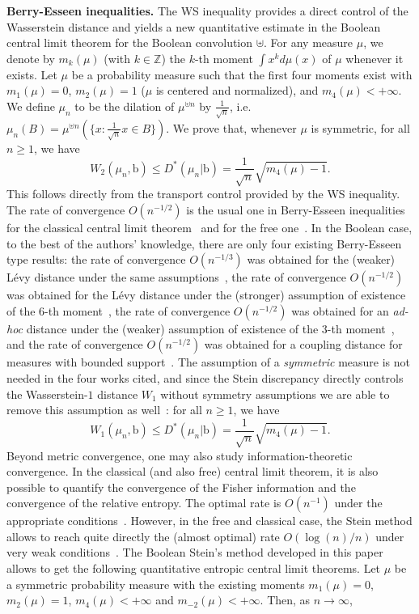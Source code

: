 \documentclass[10pt, reqno]{amsart}
\numberwithin{equation}{section}
\theoremstyle{definition}
\theoremstyle{plain}
\theoremstyle{remark}
\newcommand{\1}{\mathbbm{1}}
\begin{document}
\noindent \textbf{Berry-Esseen inequalities.} The WS inequality provides a direct control of the Wasserstein distance and yields a new quantitative estimate in the Boolean central limit theorem for the Boolean convolution $\uplus$. For any measure $\mu$, we denote by $m_k(\mu)$ (with $k\in \mathbb{Z}$) the $k$-th moment $\int x^k d\mu(x)$ of $\mu$ whenever it exists. Let $\mu$ be a probability measure such that the first four moments exist with $m_1(\mu) = 0$, $m_2(\mu) = 1$ ($\mu$ is centered and normalized),
and $m_4(\mu) < +\infty$.  We define $\mu_n$ to be the dilation of $\mu^{\uplus n}$ by $\frac{1}{\sqrt{n}}$, i.e. $\mu_n(B)=\mu^{\uplus n}(\{x:\frac{1}{\sqrt{n}}x\in B\})$. We prove that, whenever $\mu$ is symmetric, for all $n\geq 1$, we have
$$W_2(\mu_n, \mathbb{\mathrm{b}})\leq D^*(\mu_n|\mathbb{\mathrm{b}})=\frac{1}{\sqrt{n}}\sqrt{m_4(\mu)-1}.$$
This follows directly from the transport control provided by the WS inequality.
The rate of convergence $O(n^{-1/2})$ is the usual one in Berry-Esseen inequalities for the classical central limit theorem~\cite{berry1941accuracy,esseen1945fourier} and for the free one~\cite{chistyakov2008limit,kargin2007berry}. In the Boolean case, to the best of the authors' knowledge, there are only four existing Berry-Esseen type results: the rate of convergence $O(n^{-1/3})$ was obtained for the (weaker) Lévy distance under the same assumptions~\cite{arizmendi2018berry}, the rate of convergence $O(n^{-1/2})$ was obtained for the Lévy distance under the (stronger) assumption of existence of the $6$-th moment~\cite{salazar2022berry}, the rate of convergence $O(n^{-1/2})$ was obtained for an \textit{ad-hoc} distance under the (weaker) assumption of existence of the $3$-th moment~\cite{hamdan2023fixed}, and the rate of convergence $O(n^{-1/2})$ was obtained for a coupling distance for measures with bounded support~\cite{jekel2019operad}. The assumption of a \textit{symmetric} measure is not needed in the four works cited, and since the Stein discrepancy directly controls the Wasserstein-$1$ distance $W_1$ without symmetry assumptions we are able to remove this assumption as well~: 
for all $n\geq 1$, we have
$$W_1(\mu_n, \mathbb{\mathrm{b}})\leq D^*(\mu_n|\mathbb{\mathrm{b}})=\frac{1}{\sqrt{n}}\sqrt{m_4(\mu)-1}.$$
Beyond metric convergence, one may also study information-theoretic convergence. In the classical (and also free) central limit theorem, it is also possible to quantify the convergence of the Fisher information and the convergence of the relative entropy.  The optimal rate is $O(n^{-1})$ under the appropriate conditions~\cite{artstein2004rate,chistyakov2013asymptotic,johnson2004fisher}. However, in the free and classical case, the Stein method allows to reach quite directly the (almost optimal) rate $O(\log(n)/n)$ under very weak conditions~\cite{ledoux2015stein,fathi2017free}. The Boolean Stein's method  developed in this paper allows to get the following quantitative entropic central limit theorems. 
Let $\mu$ be a symmetric probability measure with the existing moments $m_1(\mu) = 0$, $m_2(\mu) = 1$, $m_4(\mu) <+\infty$ and $m_{-2}(\mu) < +\infty$. Then, as $n\to \infty$,
\end{document}
